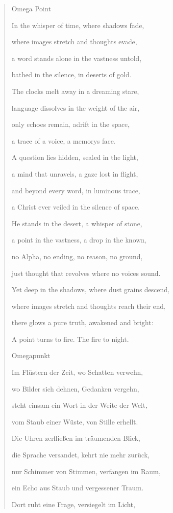 \documentclass[
  ngerman,
]{article}
\begin{document}
\begin{quote}
Omega Point

In the whisper of time, where shadows fade,

where images stretch and thoughts evade,

a word stands alone in the vastness untold,

bathed in the silence, in deserts of gold.

The clocks melt away in a dreaming stare,

language dissolves in the weight of the air,

only echoes remain, adrift in the space,

a trace of a voice, a memory\textquotesingle s face.

A question lies hidden, sealed in the light,

a mind that unravels, a gaze lost in flight,

and beyond every word, in luminous trace,

a Christ ever veiled in the silence of space.

He stands in the desert, a whisper of stone,

a point in the vastness, a drop in the known,

no Alpha, no ending, no reason, no ground,

just thought that revolves where no voices sound.

Yet deep in the shadows, where dust grains descend,

where images stretch and thoughts reach their end,

there glows a pure truth, awakened and bright:

A point turns to fire. The fire to night.

Omegapunkt

Im Flüstern der Zeit, wo Schatten verwehn,

wo Bilder sich dehnen, Gedanken vergehn,

steht einsam ein Wort in der Weite der Welt,

vom Staub einer Wüste, von Stille erhellt.

Die Uhren zerfließen im träumenden Blick,

die Sprache versandet, kehrt nie mehr zurück,

nur Schimmer von Stimmen, verfangen im Raum,

ein Echo aus Staub und vergessener Traum.

Dort ruht eine Frage, versiegelt im Licht,


\end{quote}
\end{document}
